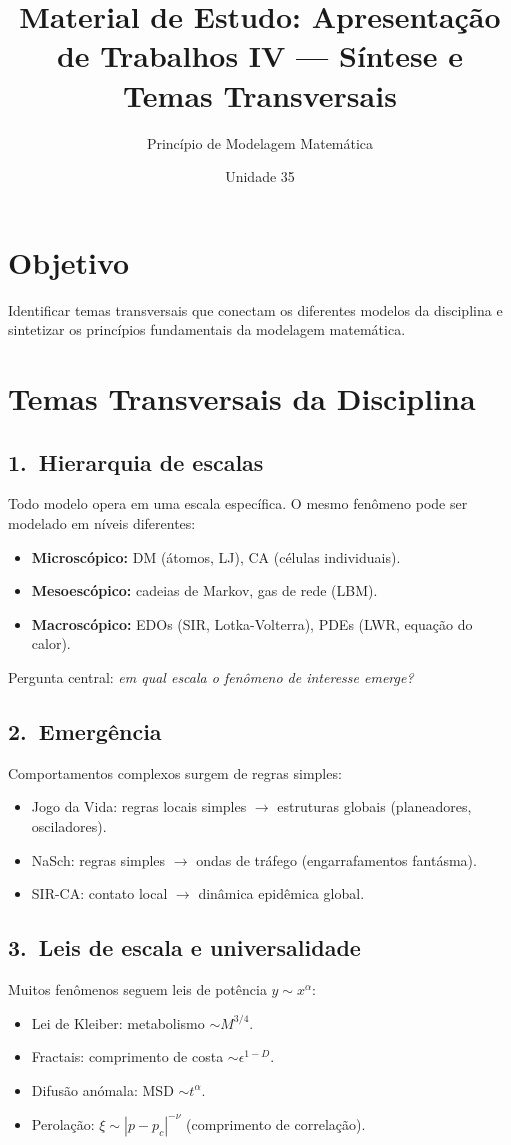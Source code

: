 \documentclass[12pt,a4paper]{article}
\title{Material de Estudo: Apresenta\c{c}\~ao de Trabalhos IV --- S\'intese e Temas Transversais}
\author{Princ\'ipio de Modelagem Matem\'atica}
\date{Unidade 35}
\begin{document}
\maketitle

\section*{Objetivo}
Identificar temas transversais que conectam os diferentes modelos da disciplina e sintetizar os princ\'ipios fundamentais da modelagem matem\'atica.

\section*{Temas Transversais da Disciplina}

\subsection*{1.\ Hierarquia de escalas}
Todo modelo opera em uma escala espec\'ifica. O mesmo fen\^omeno pode ser modelado em n\'iveis diferentes:
\begin{itemize}
  \item \textbf{Microsc\'opico:} DM (\'atomos, LJ), CA (c\'elulas individuais).
  \item \textbf{Mesoesc\'opico:} cadeias de Markov, gas de rede (LBM).
  \item \textbf{Macrosc\'opico:} EDOs (SIR, Lotka-Volterra), PDEs (LWR, equa\c{c}\~ao do calor).
\end{itemize}
Pergunta central: \textit{em qual escala o fen\^omeno de interesse emerge?}

\subsection*{2.\ Emerg\^encia}
Comportamentos complexos surgem de regras simples:
\begin{itemize}
  \item Jogo da Vida: regras locais simples $\to$ estruturas globais (planeadores, osciladores).
  \item NaSch: regras simples $\to$ ondas de tr\'afego (engarrafamentos fant\'asma).
  \item SIR-CA: contato local $\to$ din\^amica epidêmica global.
\end{itemize}

\subsection*{3.\ Leis de escala e universalidade}
Muitos fen\^omenos seguem leis de pot\^encia $y \sim x^\alpha$:
\begin{itemize}
  \item Lei de Kleiber: metabolismo $\sim M^{3/4}$.
  \item Fractais: comprimento de costa $\sim \epsilon^{1-D}$.
  \item Difus\~ao an\'omala: MSD $\sim t^\alpha$.
  \item Perola\c{c}\~ao: $\xi \sim |p - p_c|^{-\nu}$ (comprimento de correla\c{c}\~ao).
\end{itemize}
\end{document}

